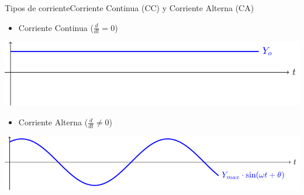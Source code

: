 \documentclass[aspectratio=169, xcolor={usenames,svgnames,dvipsnames}]{beamer}
\begin{document}
\begin{frame}{Tipos de corriente}{Corriente Continua (CC) y Corriente Alterna (CA)}
\begin{itemize}
\item Corriente Continua (\(\frac{d}{dt} = 0\))
\end{itemize}
\begin{center}
\includegraphics[height=0.25\textheight]{../figs/continua.pdf}
\end{center}

\begin{itemize}
\item Corriente Alterna (\(\frac{d}{dt} \neq 0\))
\end{itemize}
\begin{center}
\includegraphics[height=0.25\textheight]{../figs/sin.pdf}
\end{center}
\end{frame}
\end{document}
